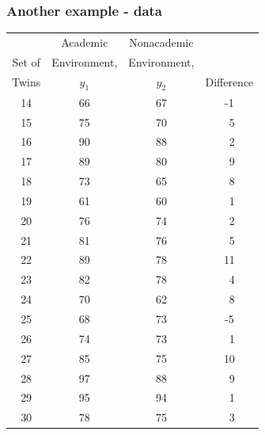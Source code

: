 \documentclass[xcolor=dvipsnames,12pt]{beamer}
\begin{document}
 
 \begin{frame}
\frametitle{Another example - data}
\begin{tiny}
\begin{center}
\begin{tabular}{cccc} \hline
& \multicolumn{1}{c}{Academic} 
& \multicolumn{1}{c}{Nonacademic}  &\\
Set of & \multicolumn{1}{c}{Environment,} 
& \multicolumn{1}{c}{Environment,}  &\\
Twins & $y_1$ & $y_2$ & \multicolumn{1}{c}{Difference} \\ \hline
14 & 66 & 67 & -1 \\
15 & 75 & 70 & ~5 \\
16 & 90 & 88 & ~2 \\
17 & 89 & 80 & ~9 \\
18 & 73 & 65 & ~8 \\
19 & 61 & 60 & ~1 \\
20 & 76 & 74 & ~2 \\
21 & 81 & 76 & ~5 \\
22 & 89 & 78 & 11 \\
23 & 82 & 78 & ~4 \\
24 & 70 & 62 & ~8 \\
25 & 68 & 73 & -5 \\
26 & 74 & 73 & ~1 \\
27 & 85 & 75 & 10 \\
28 & 97 & 88 & ~9 \\
29 & 95 & 94 & ~1 \\
30 & 78 & 75 & ~3 \\ \hline
\end{tabular}
\end{center}
\end{tiny}
\end{frame}
\end{document}
